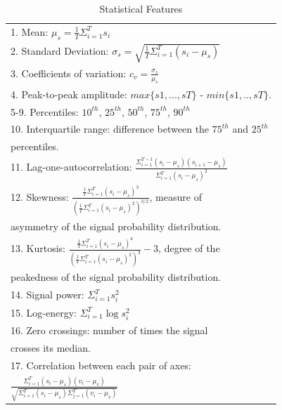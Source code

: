 \documentclass[10pt,twocolumn,letterpaper]{article}
\begin{document}
\begin{table}[t]
  \small
  \caption{Statistical Features}
  \label{statistical_features}
  \centering
  \begin{tabular}{|l|}
    \hline
    1. Mean: $\mu_s = \frac{1}{T} \Sigma_{i=1}^{T} s_i$ \\
    2. Standard Deviation: $\sigma_s=\sqrt{\frac{1}{T}\Sigma_{i=1}^{T}(s_i-\mu_s)}$ \\ 
    3. Coefficients of variation: $c_v=\frac{\sigma_s}{\mu_s}$ \\
    4. Peak-to-peak amplitude: $max\{s1, ..., sT\}$ - $min\{s1, .., sT\}$. \\
    5-9. Percentiles: $10^{th}$, $25^{th}$, $50^{th}$, $75^{th}$, $90^{th}$ \\
    10. Interquartile range: difference between the $75^{th}$ and $25^{th}$ \\
          \hspace{0.5cm}  percentiles. \\ 
    11. Lag-one-autocorrelation: $\frac{\Sigma_{i=1}^{T-1}(s_i-\mu_s)(s_{i+1}-\mu_s)}
    {\Sigma_{i=1}^{T}(s_{i}-\mu_s)^2}$ \\
    12. Skewness: $\frac{\frac{1}{T}\Sigma_{i=1}^{T}(s_i-\mu_s)^3}
    {(\frac{1}{T}\Sigma_{i=1}^{T}(s_i-\mu_s)^2)^{3/2}}$, measure of \\
         \hspace{0.5cm} asymmetry of the signal probability distribution. \\
    13. Kurtosis: $\frac{\frac{1}{T}\Sigma_{i=1}^{T}(s_i-\mu_s)^4}
    {(\frac{1}{T}\Sigma_{i=1}^{T}(s_i-\mu_s)^2)^{3}}-3$, degree of the \\
        \hspace{0.5cm} peakedness of the signal probability distribution. \\
    14. Signal power: $\Sigma_{i=1}^{T}s_i^2$ \\
    15. Log-energy: $\Sigma_{i=1}^{T}\log{s_i^2}$ \\
    16. Zero crossings: number of times the signal \\
         crosses its median.\\
    17. Correlation between each pair of axes: \\
     \hspace{0.5cm}$\frac{\Sigma_{i=1}^{T}(s_i-\mu_s)(v_i-\mu_v)}{\sqrt{\Sigma_{i=1}^{T}(s_i-\mu_s)\Sigma_{j=1}^{T}(v_i-\mu_v)}}$ \\
    \hline
  \end{tabular}
\end{table}
\end{document}
